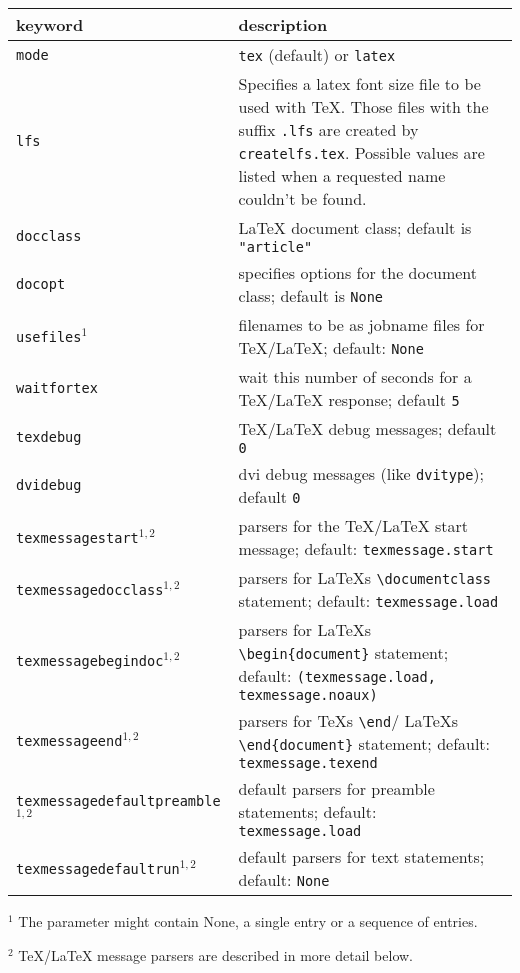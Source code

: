 \medskip
\begin{tabularx}{\linewidth}{l>{\raggedright\arraybackslash}X}
keyword&description\\
\hline
\texttt{mode}&\texttt{tex} (default) or \texttt{latex}\\
\texttt{lfs}&Specifies a latex font size file to be used with \TeX. Those files with the suffix \texttt{.lfs} are created by \texttt{createlfs.tex}. Possible values are listed when a requested name couldn't be found.\\
\texttt{docclass}&\LaTeX{} document class; default is \texttt{"article"}\\
\texttt{docopt}&specifies options for the document class; default is \texttt{None}\\
\texttt{usefiles}$^1$&filenames to be as jobname files for \TeX/\LaTeX{}; default: \texttt{None}\\
\texttt{waitfortex}&wait this number of seconds for a \TeX/\LaTeX{} response; default \texttt{5}\\
\texttt{texdebug}&\TeX/\LaTeX{} debug messages; default \texttt{0}\\
\texttt{dvidebug}&dvi debug messages (like \texttt{dvitype}); default \texttt{0}\\
\texttt{texmessagestart}$^{1,2}$&parsers for the \TeX/\LaTeX{} start message; default: \texttt{texmessage.start}\\
\texttt{texmessagedocclass}$^{1,2}$&parsers for \LaTeX{}s \texttt{\textbackslash{}documentclass} statement; default: \texttt{texmessage.load}\\
\texttt{texmessagebegindoc}$^{1,2}$&parsers for \LaTeX{}s \texttt{\textbackslash{}begin\{document\}} statement; default: \texttt{(texmessage.load, texmessage.noaux)}\\
\texttt{texmessageend}$^{1,2}$&parsers for \TeX{}s \texttt{\textbackslash{}end}/ \LaTeX{}s \texttt{\textbackslash{}end\{document\}} statement; default: \texttt{texmessage.texend}\\
\texttt{texmessagedefaultpreamble}$^{1,2}$&default parsers for preamble statements; default: \texttt{texmessage.load}\\
\texttt{texmessagedefaultrun}$^{1,2}$&default parsers for text statements; default: \texttt{None}\\
\end{tabularx}
\medskip

$^1$
The parameter might contain None, a single entry or a sequence of entries.

$^2$
\TeX/\LaTeX{} message parsers are described in more detail below.

